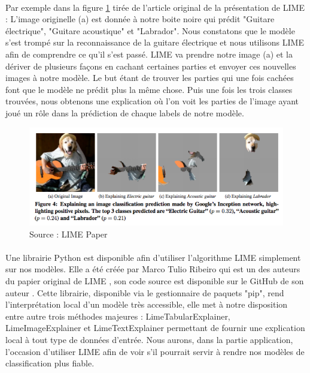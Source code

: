 \paragraph{}Par exemple dans la figure \ref{limeExemple} tirée de l'article original de la présentation de LIME\cite{limePaper} : L'image originelle (a) est donnée à notre boite noire qui prédit "Guitare électrique", "Guitare acoustique" et "Labrador". Nous constatons que le modèle s'est trompé sur la reconnaissance de la guitare électrique et nous utilisons LIME afin de comprendre ce qu'il s'est passé. LIME va prendre notre image (a) et la dériver de plusieurs façons en cachant certaines parties et envoyer ces nouvelles images à notre modèle. Le but étant de trouver les parties qui une fois cachées font que le modèle ne prédit plus la même chose. Puis une fois les trois classes trouvées, nous obtenons une explication où l'on voit les parties de l'image ayant joué un rôle dans la prédiction de chaque labels de notre modèle.
\begin{figure}[h]
\centering
\includegraphics[scale=0.35]{src_img/limeExemple.png}
\caption{Source : LIME Paper \cite{limePaper}}
\label{limeExemple}
\end{figure}
\paragraph{}Une librairie Python est disponible afin d'utiliser l'algorithme LIME simplement sur nos modèles. Elle a été créée par Marco Tulio Ribeiro qui est un des auteurs du papier original de LIME \cite{limePaper}, son code source est disponible sur le GitHub de son auteur \cite{limeDepot}. Cette librairie, disponible via le gestionnaire de paquets "pip", rend l'interprétation local d'un modèle très accessible, elle met à notre disposition entre autre trois méthodes majeures : LimeTabularExplainer, LimeImageExplainer et LimeTextExplainer permettant de fournir une explication local à tout type de données d'entrée. Nous aurons, dans la partie application, l'occasion d'utiliser LIME afin de voir s'il pourrait servir à rendre nos modèles de classification plus fiable.

